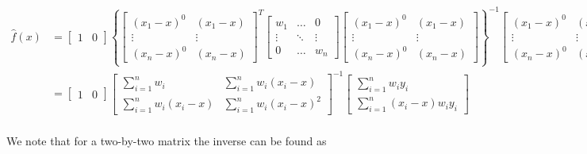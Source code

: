 \documentclass[10pt]{article}
\begin{document}
\begin{enumerate}[label=(\Alph*)]
        \scriptsize
        \begin{align*}
            \hat{f}(x) &= \begin{bmatrix} 1 & 0 \end{bmatrix} \left \{ \begin{bmatrix} (x_1 - x)^0 & (x_1 - x) \\ \vdots & \vdots \\ (x_n - x)^0 & (x_n - x)\end{bmatrix}^T \begin{bmatrix} w_1 & \dots & 0 \\ \vdots & \ddots & \vdots \\ 0 & \dots & w_n  \end{bmatrix} \begin{bmatrix} (x_1 - x)^0 & (x_1 - x) \\ \vdots & \vdots \\ (x_n - x)^0 & (x_n - x)\end{bmatrix} \right\}^{-1} \begin{bmatrix} (x_1 - x)^0 & (x_1 - x) \\ \vdots & \vdots \\ (x_n - x)^0 & (x_n - x)\end{bmatrix}^T \begin{bmatrix} w_1 & \dots & 0 \\ \vdots & \ddots & \vdots \\ 0 & \dots & w_n  \end{bmatrix} \begin{bmatrix} y_1 \\ \vdots \\ y_n\end{bmatrix} \\
            &= \begin{bmatrix} 1 & 0 \end{bmatrix}  \begin{bmatrix} \sum_{i=1}^n w_i & \sum_{i=1}^n w_i (x_i -x) \\ \sum_{i=1}^n w_i (x_i -x) & \sum_{i=1}^n w_i (x_i -x)^2\end{bmatrix}^{-1} \begin{bmatrix} \sum_{i=1}^n w_i y_i \\ \sum_{i=1}^n (x_i - x) w_i y_i\end{bmatrix} \\
        \end{align*}
        \normalsize

        We note that for a two-by-two matrix the inverse can be found as 


\end{enumerate}
\end{document}
